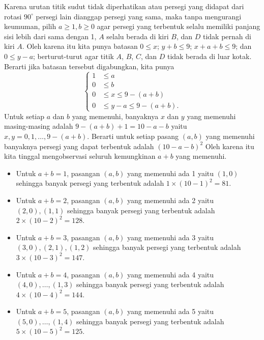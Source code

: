 \begin{solusi}
\begin{center}
\end{center}
 Karena urutan titik sudut tidak diperhatikan atau persegi yang didapat dari rotasi $90^\circ$ persegi lain dianggap persegi yang sama, maka tanpa mengurangi keumuman, pilih $a \ge 1,b \ge 0$ agar persegi yang terbentuk selalu memiliki panjang sisi lebih dari sama dengan 1, $A$ selalu berada di kiri $B$, dan $D$ tidak pernah di kiri $A$. Oleh karena itu kita punya batasan $0 \le x$; $y+b \le 9$; $x+a+b \le 9$; dan $0 \le y-a$; berturut-turut agar titik $A$, $B$, $C$, dan $D$ tidak berada di luar kotak. Berarti jika batasan tersebut digabungkan, kita punya
 $$
 \begin{cases}
 1 &\le a\\
 0 &\le b\\ 
 0 &\le x \le 9-(a+b)\\
 0 &\le y-a \le 9-(a+b).
 \end{cases}
 $$
 Untuk setiap $a$ dan $b$ yang memenuhi, banyaknya $x$ dan $y$ yang memenuhi masing-masing adalah $9-(a+b)+1 = 10-a-b$ yaitu $x,y = 0,1,\dots,9-(a+b)$. Berarti untuk setiap pasang $(a,b)$ yang memenuhi banyaknya persegi yang dapat terbentuk adalah $(10-a-b)^2$  Oleh karena itu kita tinggal mengobservasi seluruh kemungkinan $a+b$ yang memenuhi.
 \begin{itemize}
 \item Untuk $a+b=1$, pasangan $(a,b)$ yang memenuhi ada 1 yaitu $(1,0)$ sehingga banyak persegi yang terbentuk adalah $1 \times (10-1)^2 = 81$.
 \item Untuk $a+b=2$, pasangan $(a,b)$ yang memenuhi ada 2 yaitu $(2,0),(1,1)$ sehingga banyak persegi yang terbentuk adalah $2 \times (10-2)^2 = 128$.
 \item Untuk $a+b=3$, pasangan $(a,b)$ yang memenuhi ada 3 yaitu $(3,0),(2,1),(1,2)$ sehingga banyak persegi yang terbentuk adalah $3 \times (10-3)^2 = 147$.
 \item Untuk $a+b=4$, pasangan $(a,b)$ yang memenuhi ada 4 yaitu $(4,0),\dots,(1,3)$ sehingga banyak persegi yang terbentuk adalah $4 \times (10-4)^2 = 144$.
 \item Untuk $a+b=5$, pasangan $(a,b)$ yang memenuhi ada 5 yaitu $(5,0),\dots,(1,4)$ sehingga banyak persegi yang terbentuk adalah $5 \times (10-5)^2 = 125$.

\end{itemize}
\end{solusi}

